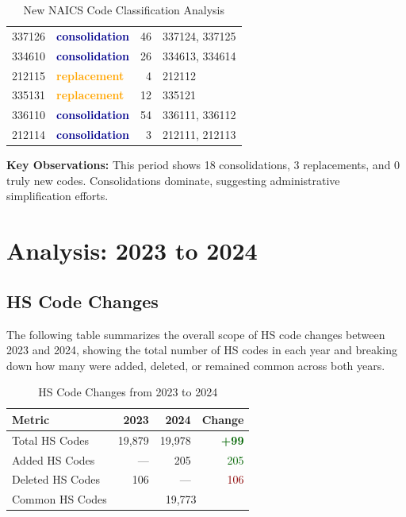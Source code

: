 \documentclass[11pt]{article}
\newcommand{\increase}[1]{\textcolor{darkgreen}{\textbf{+#1}}}
\begin{document}
\begin{table}[H]
\begin{tabular}{llrl}
337126 & \textcolor{darkblue}{\textbf{consolidation}} & 46 & 337124, 337125 \\
334610 & \textcolor{darkblue}{\textbf{consolidation}} & 26 & 334613, 334614 \\
212115 & \textcolor{orange}{\textbf{replacement}} & 4 & 212112 \\
335131 & \textcolor{orange}{\textbf{replacement}} & 12 & 335121 \\
336110 & \textcolor{darkblue}{\textbf{consolidation}} & 54 & 336111, 336112 \\
212114 & \textcolor{darkblue}{\textbf{consolidation}} & 3 & 212111, 212113 \\
\bottomrule
\end{tabular}
\caption{New NAICS Code Classification Analysis}
\end{table}

\textbf{Key Observations:} This period shows 18 consolidations, 3 replacements, and 0 truly new codes. Consolidations dominate, suggesting administrative simplification efforts.

\newpage


\section{Analysis: 2023 to 2024}

\subsection{HS Code Changes}

The following table summarizes the overall scope of HS code changes between 2023 and 2024, showing the total number of HS codes in each year and breaking down how many were added, deleted, or remained common across both years.

\begin{table}[H]
\centering
{}
\begin{tabular}{lrrr}
\toprule
\textbf{Metric} & \textbf{2023} & \textbf{2024} & \textbf{Change} \\
\midrule
Total HS Codes & 19,879 & 19,978 & \increase{99} \\
Added HS Codes & --- & 205 & \textcolor{darkgreen}{205} \\
Deleted HS Codes & 106 & --- & \textcolor{darkred}{106} \\
Common HS Codes & \multicolumn{3}{c}{19,773} \\
\bottomrule
\end{tabular}
\caption{HS Code Changes from 2023 to 2024}
\end{table}
\end{document}
